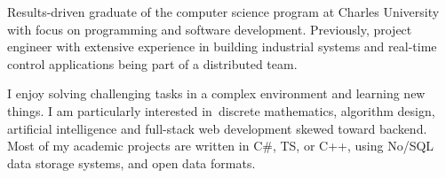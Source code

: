 Results-driven graduate of the computer science program at Charles University with focus on programming and software development. Previously, project engineer with extensive experience in building industrial systems and real-time control applications being part of a distributed team.

I enjoy solving challenging tasks in a complex environment and learning new things. I am particularly interested in~dis\-crete mathematics, algorithm design, artificial intelligence and full-stack web development skewed toward backend. Most of my academic projects are written in C\#, TS, or C++, using No/SQL data storage systems, and open data formats.
